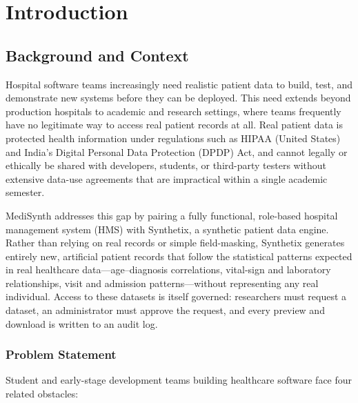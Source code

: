 \documentclass{tietreport}
\author{%
  \texttt{1024030787} Aryan Sharma \\
  \texttt{1024030792} Brahmdeep Singh Khanuja \\
  \texttt{1024030793} Keerat Singh Brar%
}
\begin{document}
\maketitle
\tableofcontents


\chapter{Introduction}

\section{Background and Context}

Hospital software teams increasingly need realistic patient data to build,
test, and demonstrate new systems before they can be deployed. This need
extends beyond production hospitals to academic and research settings, where
teams frequently have no legitimate way to access real patient records at
all. Real patient data is protected health information under regulations such
as HIPAA (United States) and India's Digital Personal Data Protection (DPDP)
Act, and cannot legally or ethically be shared with developers, students, or
third-party testers without extensive data-use agreements that are impractical
within a single academic semester.

MediSynth addresses this gap by pairing a fully functional, role-based
hospital management system (HMS) with Synthetix, a synthetic patient data
engine. Rather than relying on real records or simple field-masking,
Synthetix generates entirely new, artificial patient records that follow the
statistical patterns expected in real healthcare data---age--diagnosis
correlations, vital-sign and laboratory relationships, visit and admission
patterns---without representing any real individual. Access to these datasets
is itself governed: researchers must request a dataset, an administrator must
approve the request, and every preview and download is written to an audit
log.

\subsection{Problem Statement}

Student and early-stage development teams building healthcare software face
four related obstacles:
\end{document}
